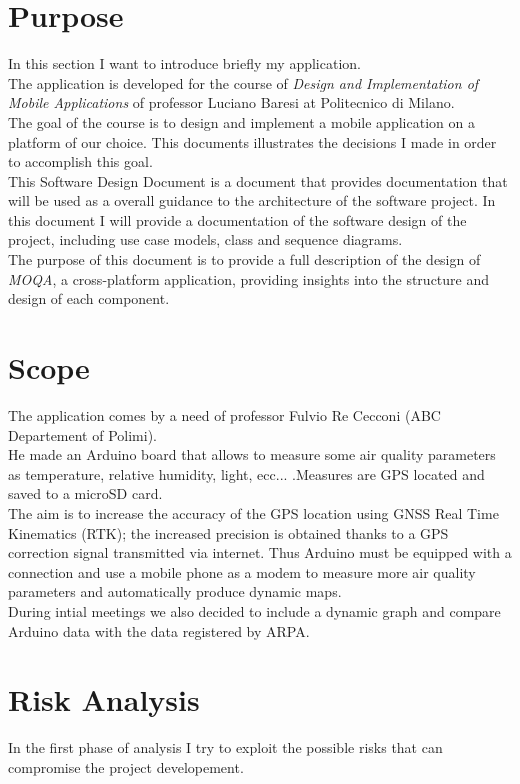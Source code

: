 \section{Purpose}
In this section I want to introduce briefly my application.\\

The application is developed for the course of \textit{Design and Implementation of Mobile
Applications} of professor Luciano Baresi at Politecnico di Milano.\\
The goal of the course is to design and implement a mobile application on a platform of our choice.
This documents illustrates the decisions I made in order to accomplish this goal.\\

This Software Design Document is a document that provides documentation that will be
used as a overall guidance to the architecture of the software project. In this document I will
provide a documentation of the software design of the project, including use case models,
class and sequence diagrams.\\

The purpose of this document is to provide a full description of the design of \textit{MOQA}, a cross-platform application, providing insights into the structure and design of each component.

\section{Scope}
The application comes by a need of professor Fulvio Re Cecconi (ABC Departement of Polimi).\\
He made an Arduino board that allows to measure some
air quality parameters as temperature, relative humidity, light, ecc... .Measures are GPS located and saved to a microSD card.\\

The aim is to increase the accuracy of the GPS location using GNSS Real Time Kinematics (RTK); the increased precision is obtained thanks to a GPS correction signal transmitted via internet. Thus Arduino must be equipped with a connection and use a mobile phone as a modem to measure more air quality parameters and automatically produce dynamic maps.\\

During intial meetings we also decided to include a dynamic graph and compare Arduino data with the data registered by ARPA.

\section{Risk Analysis}
In the first phase of analysis I try to exploit the possible risks that can compromise the project developement.\\

